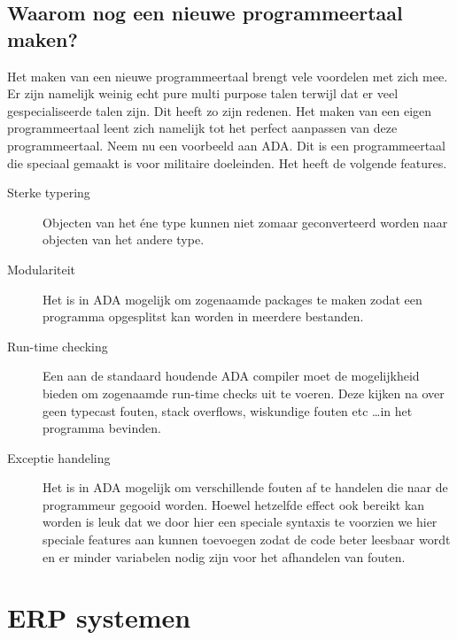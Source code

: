 \documentclass[11pt,a4paper]{article}
\begin{document}
\subsection{Waarom nog een nieuwe programmeertaal maken?}
Het maken van een nieuwe programmeertaal brengt vele voordelen met zich mee. Er zijn namelijk weinig echt pure multi purpose talen terwijl dat er veel gespecialiseerde talen zijn. Dit heeft zo zijn redenen. Het maken van een eigen programmeertaal leent zich namelijk tot het perfect aanpassen van deze programmeertaal. Neem nu een voorbeeld aan ADA. Dit is een programmeertaal die speciaal gemaakt is voor militaire doeleinden. Het heeft de volgende features.

\begin{description}
\item[Sterke typering] Objecten van het éne type kunnen niet zomaar geconverteerd worden naar objecten van het andere type.
\item[Modulariteit] Het is in ADA mogelijk om zogenaamde packages te maken zodat een programma opgesplitst kan worden in meerdere bestanden.
\item[Run-time checking] Een aan de standaard houdende ADA compiler moet de mogelijkheid bieden om zogenaamde run-time checks uit te voeren. Deze kijken na over geen typecast fouten, stack overflows, wiskundige fouten etc \ldots in het programma bevinden.
\item[Exceptie handeling] Het is in ADA mogelijk om verschillende fouten af te handelen die naar de programmeur gegooid worden. Hoewel hetzelfde effect ook bereikt kan worden is leuk dat we door hier een speciale syntaxis te voorzien we hier speciale features aan kunnen toevoegen zodat de code beter leesbaar wordt en er minder variabelen nodig zijn voor het afhandelen van fouten.
\end{description}

\section{ERP systemen}

\end{document}
